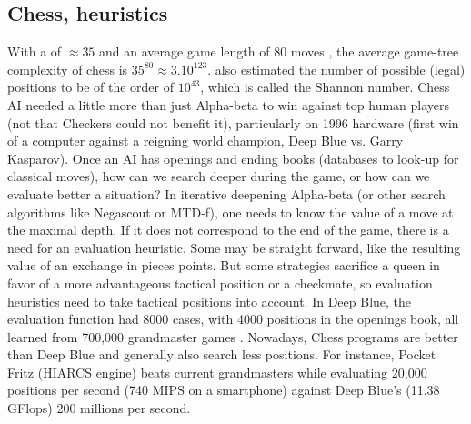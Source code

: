 \subsection{Chess, heuristics}
With a  of $\approx 35$ and an average game length of 80 moves \citep{Shannon_1950}, the average game-tree complexity of chess is $35^{80}\approx 3.10^{123}$. \citet{Shannon_1950} also estimated the number of possible (legal) positions to be of the order of $10^{43}$, which is called the Shannon number. Chess AI needed a little more than just Alpha-beta to win against top human players (not that Checkers could not benefit it), particularly on 1996 hardware (first win of a computer against a reigning world champion, Deep Blue vs. Garry Kasparov). Once an AI has openings and ending books (databases to look-up for classical moves), how can we search deeper during the game, or how can we evaluate better a situation? In iterative deepening Alpha-beta (or other search algorithms like Negascout \citep{reinfeld1983negascout} or MTD-f\citep{Plaat1996}), one needs to know the value of a move at the maximal depth. If it does not correspond to the end of the game, there is a need for an evaluation heuristic. Some may be straight forward, like the resulting value of an exchange in pieces points. But some strategies sacrifice a queen in favor of a more advantageous tactical position or a checkmate, so evaluation heuristics need to take tactical positions into account. In Deep Blue, the evaluation function had 8000 cases, with 4000 positions in the openings book, all learned from 700,000 grandmaster games \citep{DeepBlue}. Nowadays, Chess programs are better than Deep Blue and generally also search less positions. For instance, Pocket Fritz (HIARCS engine) beats current grandmasters \citep{PocketFritz,CopaMercosur} while evaluating 20,000 positions per second (740 MIPS on a smartphone) against Deep Blue's (11.38 GFlops) 200 millions per second.

